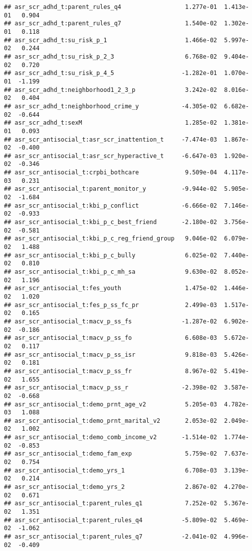 \documentclass[
]{article}
\begin{document}
\begin{verbatim}
## asr_scr_adhd_t:parent_rules_q4                  1.277e-01  1.413e-01   0.904
## asr_scr_adhd_t:parent_rules_q7                  1.540e-02  1.302e-01   0.118
## asr_scr_adhd_t:su_risk_p_1                      1.466e-02  5.997e-02   0.244
## asr_scr_adhd_t:su_risk_p_2_3                    6.768e-02  9.404e-02   0.720
## asr_scr_adhd_t:su_risk_p_4_5                   -1.282e-01  1.070e-01  -1.199
## asr_scr_adhd_t:neighborhood1_2_3_p              3.242e-02  8.016e-02   0.404
## asr_scr_adhd_t:neighborhood_crime_y            -4.305e-02  6.682e-02  -0.644
## asr_scr_adhd_t:sexM                             1.285e-02  1.381e-01   0.093
## asr_scr_antisocial_t:asr_scr_inattention_t     -7.474e-03  1.867e-02  -0.400
## asr_scr_antisocial_t:asr_scr_hyperactive_t     -6.647e-03  1.920e-02  -0.346
## asr_scr_antisocial_t:crpbi_bothcare             9.509e-04  4.117e-03   0.231
## asr_scr_antisocial_t:parent_monitor_y          -9.944e-02  5.905e-02  -1.684
## asr_scr_antisocial_t:kbi_p_conflict            -6.666e-02  7.146e-02  -0.933
## asr_scr_antisocial_t:kbi_p_c_best_friend       -2.180e-02  3.756e-02  -0.581
## asr_scr_antisocial_t:kbi_p_c_reg_friend_group   9.046e-02  6.079e-02   1.488
## asr_scr_antisocial_t:kbi_p_c_bully              6.025e-02  7.440e-02   0.810
## asr_scr_antisocial_t:kbi_p_c_mh_sa              9.630e-02  8.052e-02   1.196
## asr_scr_antisocial_t:fes_youth                  1.475e-02  1.446e-02   1.020
## asr_scr_antisocial_t:fes_p_ss_fc_pr             2.499e-03  1.517e-02   0.165
## asr_scr_antisocial_t:macv_p_ss_fs              -1.287e-02  6.902e-02  -0.186
## asr_scr_antisocial_t:macv_p_ss_fo               6.608e-03  5.672e-02   0.117
## asr_scr_antisocial_t:macv_p_ss_isr              9.818e-03  5.426e-02   0.181
## asr_scr_antisocial_t:macv_p_ss_fr               8.967e-02  5.419e-02   1.655
## asr_scr_antisocial_t:macv_p_ss_r               -2.398e-02  3.587e-02  -0.668
## asr_scr_antisocial_t:demo_prnt_age_v2           5.205e-03  4.782e-03   1.088
## asr_scr_antisocial_t:demo_prnt_marital_v2       2.053e-02  2.049e-02   1.002
## asr_scr_antisocial_t:demo_comb_income_v2       -1.514e-02  1.774e-02  -0.853
## asr_scr_antisocial_t:demo_fam_exp               5.759e-02  7.637e-02   0.754
## asr_scr_antisocial_t:demo_yrs_1                 6.708e-03  3.139e-02   0.214
## asr_scr_antisocial_t:demo_yrs_2                 2.867e-02  4.270e-02   0.671
## asr_scr_antisocial_t:parent_rules_q1            7.252e-02  5.367e-02   1.351
## asr_scr_antisocial_t:parent_rules_q4           -5.809e-02  5.469e-02  -1.062
## asr_scr_antisocial_t:parent_rules_q7           -2.041e-02  4.996e-02  -0.409

\end{verbatim}
\end{document}
